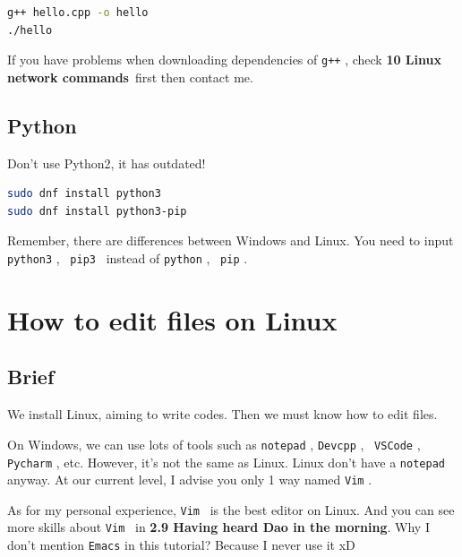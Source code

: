 \documentclass[lang=en,color=blue,12pt]{elegantbook}
\let\oldtexttt\texttt
\renewcommand{\texttt}[1]{%
  \begingroup
  \setlength{\fboxsep}{1pt}%
  \colorbox{gray!10}{\oldtexttt{#1}}%
  \endgroup
}
\begin{document}
\begin{lstlisting}[language=bash]
g++ hello.cpp -o hello
./hello
\end{lstlisting}

\begin{note}
If you have problems when downloading dependencies of \texttt{g++}, check
\textbf{10 Linux network commands}\ first then contact me.
\end{note}

\subsection{\textbf{Python}}

\begin{important*}
Don't use Python2, it has outdated!
\end{important*}

\begin{lstlisting}[language=bash]
sudo dnf install python3
sudo dnf install python3-pip
\end{lstlisting}

Remember, there are differences between Windows and Linux. You need to
input \texttt{python3},\ \texttt{pip3}\ instead of \texttt{python},\
\texttt{pip}.

\section{\textbf{How to edit files on Linux}}

\subsection{\textbf{Brief}}

We install Linux, aiming to write codes. Then we must know how to edit
files.

On Windows, we can use lots of tools such as \texttt{notepad},
\texttt{Devcpp},\ \texttt{VSCode},\ \texttt{Pycharm}, etc. However,
it's not the same as Linux. Linux don't
have a \texttt{notepad} anyway. At our current level, I advise you only
1 way named \texttt{Vim}.

\begin{note}
As for my personal experience, \texttt{Vim}\ is the best editor on Linux.
And you can see more skills about \texttt{Vim}\ in 
\textbf{2.9 Having heard Dao in the morning}.
Why I don't mention \texttt{Emacs} in this tutorial? Because I never use it xD
\end{note}
\end{document}
